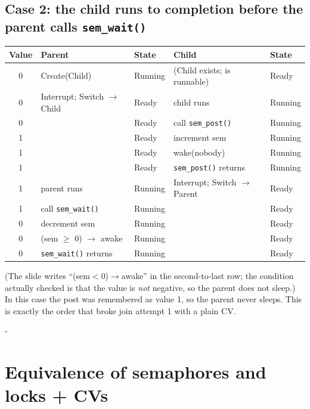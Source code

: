 \documentclass[11pt,a4paper]{article}
\makeatletter
\newcommand{\keepspace}[1]{\par\penalty-100\begingroup
  \setlength{\dimen@}{#1}\dimen@ii\pagegoal\advance\dimen@ii-\pagetotal
  \ifdim\dimen@>\dimen@ii\ifdim\dimen@ii>\z@\vfil\fi\break\fi\endgroup}
\makeatother
\begin{document}
\subsection{Case 2: the child runs to completion before the parent calls \texttt{sem\_wait()}}

\begin{center}
\small
\renewcommand{\arraystretch}{1.08}
\begin{tabular}{@{}cllll@{}}
  \toprule
  \textbf{Value} & \textbf{Parent} & \textbf{State} & \textbf{Child} & \textbf{State} \\
  \midrule
  0 & Create(Child)                  & Running & (Child exists; is runnable) & Ready \\
  0 & Interrupt; Switch \(\to\) Child & Ready  & child runs & Running \\
  0 &                                & Ready   & call \texttt{sem\_post()} & Running \\
  1 &                                & Ready   & increment sem & Running \\
  1 &                                & Ready   & wake(nobody) & Running \\
  1 &                                & Ready   & \texttt{sem\_post()} returns & Running \\
  1 & parent runs                    & Running & Interrupt; Switch \(\to\) Parent & Ready \\
  1 & call \texttt{sem\_wait()}      & Running & & Ready \\
  0 & decrement sem                  & Running & & Ready \\
  0 & (sem \(\geq\) 0) \(\to\) awake & Running & & Ready \\
  0 & \texttt{sem\_wait()} returns   & Running & & Ready \\
  \bottomrule
\end{tabular}
\end{center}

(The slide writes ``(sem\(<\)0)\(\to\)awake'' in the second-to-last row; the
condition actually checked is that the value is \emph{not} negative, so the
parent does not sleep.) In this case the post was remembered as value 1, so
the parent never sleeps. This is exactly the order that broke join attempt 1
with a plain CV.

\keepspace{16\baselineskip}
\section{Equivalence of semaphores and locks + CVs}
\end{document}
